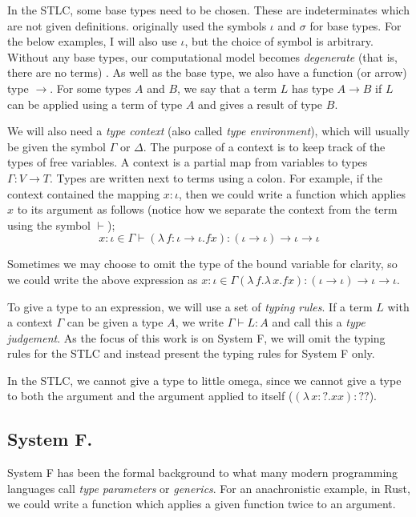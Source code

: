 In the STLC, some base types need to be chosen. These are indeterminates which are not given
definitions. \citet{church_formulation_1940} originally used the symbols $\iota$ and $\sigma$ for
base types. For the below examples, I will also use $\iota$, but the choice of symbol is arbitrary.
Without any base types, our computational model becomes \textit{degenerate} (that is, there are no
terms) \citep{pierce_types_2002}. As well as the base type, we also have a function (or arrow) type
$\to$. For some types $A$ and $B$, we say that a term $L$ has type $A \to B$ if $L$ can be applied
using a term of type $A$ and gives a result of type $B$.

We will also need a \textit{type context} (also called \textit{type environment}), which will
usually be given the symbol $\Gamma$ or $\Delta$. The purpose of a context is to keep track of the
types of free variables. A context is a partial map from variables to types $\Gamma \colon V \to T$.
Types are written next to terms using a colon. For example, if the context contained the mapping $x
\colon \iota$, then we could write a function which applies $x$ to its argument as follows (notice
how we separate the context from the term using the symbol $\vdash$);
\begin{equation*}
  x \colon \iota \in \Gamma \vdash (\lambda \, f \colon \iota \to \iota . f x)
  \colon (\iota \to \iota) \to \iota \to \iota
\end{equation*}

Sometimes we may choose to omit the type of the bound variable for clarity, so we could write the
above expression as $x \colon \iota \in \Gamma (\lambda \, f. \lambda \, x. fx) \colon (\iota \to
\iota) \to \iota \to \iota$.

To give a type to an expression, we will use a set of \textit{typing rules}. If a term $L$ with a
context $\Gamma$ can be given a type $A$, we write $\Gamma \vdash L \colon A$ and call this a
\textit{type judgement}. As the focus of this work is on System F, we will omit the typing rules for
the STLC and instead present the typing rules for System F only.

In the STLC, we cannot give a type to little omega, since we cannot give a type to both the argument
and the argument applied to itself ($(\lambda \, x  \colon ? . x x) \colon ??$).

\subsection{System F.}
System F has been the formal background to what many modern programming languages call \textit{type
parameters} or \textit{generics}. For an anachronistic example, in Rust, we could write a function
which applies a given function twice to an argument.

